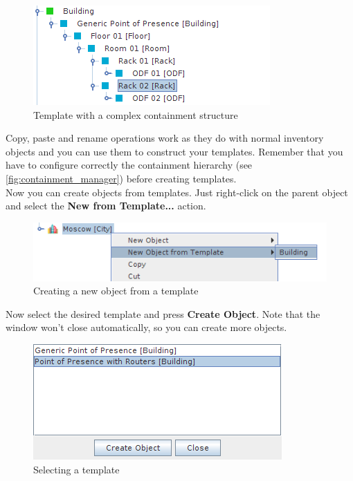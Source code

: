 \documentclass[a4paper]{article}
\begin{document}
	\begin{figure}[h!]
		\centering
		\includegraphics[width=0.6\linewidth]{img/template_manager_template_containment.png}
		\caption{Template with a complex containment structure}
		\label{fig:template_manager_template_containment}
	\end{figure}
	Copy, paste and rename operations work as they do with normal inventory objects and you can use them to construct your templates. Remember that you have to configure correctly the containment hierarchy (see \ref{fig:containment_manager}) before creating templates.\\
	Now you can create objects from templates. Just right-click on the parent object and select the \textbf{New from Template...} action.\\
	\begin{figure}[h!]
		\centering
		\includegraphics[width=0.6\linewidth]{img/template_manager_new_from_template.png}
		\caption{Creating a new object from a template}
		\label{fig:template_manager_new_from_template}
	\end{figure}
	
	\newpage
	Now select the desired template and press \textbf{Create Object}. Note that the window won't close automatically, so you can create more objects.
	\begin{figure}[h!]
		\centering
		\includegraphics[width=0.6\linewidth]{img/template_manager_select_template.png}
		\caption{Selecting a template}
		\label{fig:template_manager_select_template}
	\end{figure}
	
\end{document}
